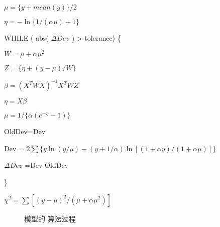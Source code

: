 \documentclass[letterpaper,10pt,english]{sphinxmanual}
\begin{document}
\begin{DUlineblock}{0em}
\item[] \(\mu=\{y+mean(y)\}/2\)
\item[] \(\eta=- \ln \{ 1/(\alpha\mu) +1 \}\)
\item[] WHILE ( abs( \(\Delta Dev\) ) > tolerance) \{
\item[]
\begin{DUlineblock}{\DUlineblockindent}
\item[] \(W=\mu+\alpha \mu^2\)
\item[] \(Z=\{ \eta +(y-\mu)/W \}\)
\item[] \(\beta=(X^TWX)^{-1}X^TWZ\)
\item[] \(\eta = X\beta\)
\item[] \(\mu=1/\{ \alpha(e^{-\eta} -1 ) \}\)
\item[] OldDev=Dev
\item[] Dev = \(2\sum \{ y\ln(y/\mu) -(y+1/\alpha)\ln[(1+\alpha y)/(1+\alpha \mu)] \}\)
\item[] \(\Delta Dev\) =Dev \sphinxhyphen{} OldDev
\end{DUlineblock}
\item[] \}
\item[] \(\chi^2=\sum [ (y-\mu)^2/(\mu+\alpha \mu^2)]\)
\end{DUlineblock}

\begin{figure}[htbp]
\centering
\capstart

\noindent{}
\caption{ 模型的  算法过程}\label{\detokenize{_u8d1f_u4e8c_u9879_u6a21_u578b/content:id20}}\label{\detokenize{_u8d1f_u4e8c_u9879_u6a21_u578b/content:fg-nb-irls}}\end{figure}
\end{document}
